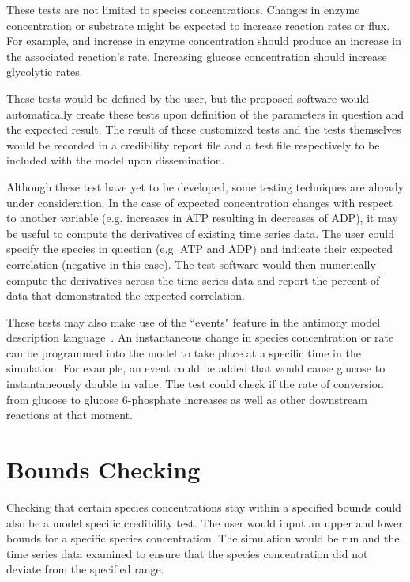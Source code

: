 \documentclass[12pt]{report}
\begin{document}
These tests are not limited to species concentrations. Changes in enzyme concentration or substrate might be expected to increase reaction rates or flux. For example, and increase in enzyme concentration should produce an increase in the associated reaction's rate. Increasing glucose concentration should increase glycolytic rates.

These tests would be defined by the user, but the proposed software would automatically create these tests upon definition of the parameters in question and the expected result. The result of these customized tests and the tests themselves would be recorded in a credibility report file and a test file respectively to be included with the model upon dissemination.

Although these test have yet to be developed, some testing techniques are already under consideration. In the case of expected concentration changes with respect to another variable (e.g. increases in ATP resulting in decreases of ADP), it may be useful to compute the derivatives of existing time series data. The user could specify the species in question (e.g. ATP and ADP) and indicate their expected correlation (negative in this case). The test software would then numerically compute the derivatives across the time series data and report the percent of data that demonstrated the expected correlation.

These tests may also make use of the ``events" feature in the antimony model description language~\cite{Smith2009}. An instantaneous change in species concentration or rate can be programmed into the model to take place at a specific time in the simulation. For example, an event could be added that would cause glucose to instantaneously double in value. The test could check if the rate of conversion from glucose to glucose 6-phosphate increases as well as other downstream reactions at that moment. 


\section{Bounds Checking}
Checking that certain species concentrations stay within a specified bounds could also be a model specific credibility test. The user would input an upper and lower bounds for a specific species concentration. The simulation would  be run and the time series data examined to ensure that the species concentration did not deviate from the specified range. 
\end{document}
